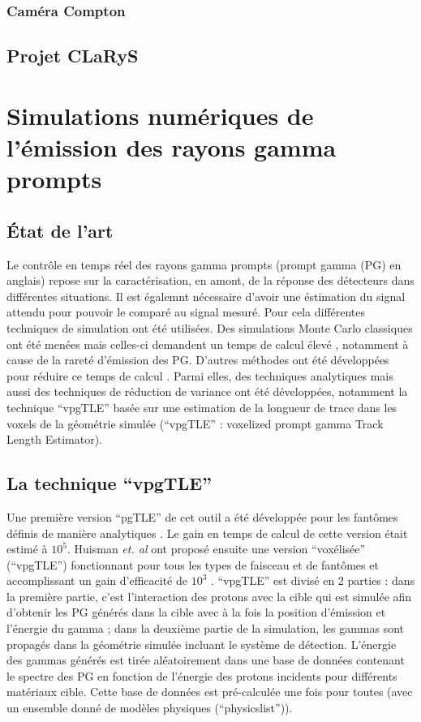\documentclass[11pt,a4paper,oldfontcommands]{memoir}
\begin{document}
\subsubsection{Caméra Compton}


\subsection{Projet CLaRyS}



\section{Simulations numériques de l'émission des rayons gamma prompts}

\subsection{\'Etat de l'art}

Le contrôle en temps réel des rayons gamma prompts (prompt gamma (PG) en anglais) repose sur la caractérisation, en amont, de la réponse des détecteurs dans différentes situations. Il est égalemnt nécessaire d'avoir une éstimation du signal attendu pour pouvoir le comparé au signal mesuré.  Pour cela différentes techniques de simulation ont été utilisées. Des simulations Monte Carlo classiques ont été menées mais celles-ci demandent un temps de calcul élevé \cite{KRIMMER201858}, notamment à cause de la rareté d'émission des PG. D'autres méthodes ont été développées pour réduire ce temps de calcul \cite{Qin_2017}. Parmi elles, des techniques analytiques \cite{Sterpin_2015} mais aussi des techniques de réduction de variance ont été développées, notamment la technique \enquote{vpgTLE} basée sur une estimation de la longueur de trace dans les voxels de la géométrie simulée (\enquote{vpgTLE} : voxelized prompt gamma Track Length Estimator).

\subsection{La technique \enquote{vpgTLE}}

Une première version \enquote{pgTLE} de cet outil a été développée pour les fantômes définis de manière analytiques \cite{El_Kanawati_2015}. Le gain en temps de calcul de cette version était estimé à $10^5$. Huisman \textit{et. al} ont proposé ensuite une version \enquote{voxélisée} (\enquote{vpgTLE}) fonctionnant pour tous les types de faisceau et de fantômes et accomplissant un gain d'efficacité de $10^3$ \cite{Huisman_2016}. \enquote{vpgTLE} est divisé en 2 parties : dans la première partie, c'est l'interaction des protons avec la cible qui est simulée afin d'obtenir les PG générés dans la cible avec à la fois la position d'émission et l'énergie du gamma  ; dans la deuxième partie de la simulation, les gammas sont propagés dans la géométrie simulée incluant le système de détection. L'énergie des gammas générés est tirée aléatoirement dans une base de données contenant le spectre des PG en fonction de l'énergie des protons incidents pour différents matériaux cible. Cette base de données est pré-calculée une fois pour toutes (avec un ensemble donné de modèles physiques (\enquote{physicslist})).
\end{document}
